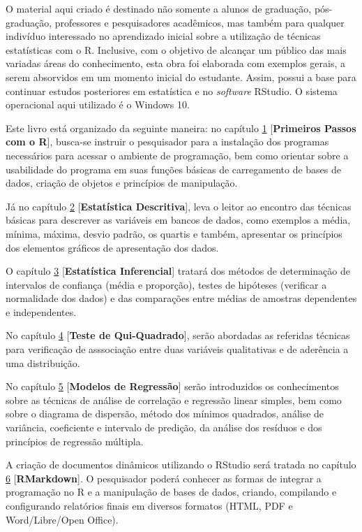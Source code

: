 \documentclass[12pt,brazil,]{book}
\begin{document}
O material aqui criado é destinado não somente a alunos de graduação,
pós-graduação, professores e pesquisadores acadêmicos, mas também para
qualquer indivíduo interessado no aprendizado inicial sobre a utilização
de técnicas estatísticas com o R. Inclusive, com o objetivo de alcançar
um público das mais variadas áreas do conhecimento, esta obra foi
elaborada com exemplos gerais, a serem absorvidos em um momento inicial
do estudante. Assim, possui a base para continuar estudos posteriores em
estatística e no \emph{software} RStudio. O sistema operacional aqui
utilizado é o Windows 10.

Este livro está organizado da seguinte maneira: no capítulo
\protect\hyperlink{intro}{1} {[}\textbf{Primeiros Passos com o R}{]},
busca-se instruir o pesquisador para a instalação dos programas
necessários para acessar o ambiente de programação, bem como orientar
sobre a usabilidade do programa em suas funções básicas de carregamento
de bases de dados, criação de objetos e princípios de manipulação.

Já no capítulo \protect\hyperlink{desc}{2} {[}\textbf{Estatística
Descritiva}{]}, leva o leitor ao encontro das técnicas básicas para
descrever as variáveis em bancos de dados, como exemplos a média,
mínima, máxima, desvio padrão, os quartis e também, apresentar os
princípios dos elementos gráficos de apresentação dos dados.

O capítulo \protect\hyperlink{inf}{3} {[}\textbf{Estatística
Inferencial}{]} tratará dos métodos de determinação de intervalos de
confiança (média e proporção), testes de hipóteses (verificar a
normalidade dos dados) e das comparações entre médias de amostras
dependentes e independentes.

No capítulo \protect\hyperlink{qui}{4} {[}\textbf{Teste de
Qui-Quadrado}{]}, serão abordadas as referidas técnicas para verificação
de asssociação entre duas variáveis qualitativas e de aderência a uma
distribuição.

No capítulo \protect\hyperlink{reg}{5} {[}\textbf{Modelos de
Regressão}{]} serão introduzidos os conhecimentos sobre as técnicas de
análise de correlação e regressão linear simples, bem como sobre o
diagrama de dispersão, método dos mínimos quadrados, análise de
variância, coeficiente e intervalo de predição, da análise dos resíduos
e dos princípios de regressão múltipla.

A criação de documentos dinâmicos utilizando o RStudio será tratada no
capítulo \protect\hyperlink{rmark}{6} {[}\textbf{RMarkdown}{]}. O
pesquisador poderá conhecer as formas de integrar a programação no R e a
manipulação de bases de dados, criando, compilando e configurando
relatórios finais em diversos formatos (HTML, PDF e Word/Libre/Open
Office).
\end{document}
